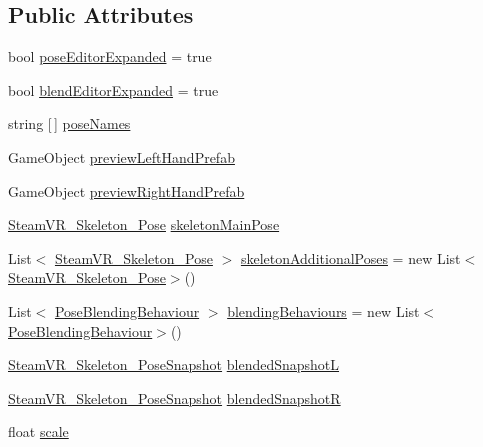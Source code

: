 \subsection*{Public Attributes}
\begin{DoxyCompactItemize}
\item 
bool \mbox{\hyperlink{class_valve_1_1_v_r_1_1_steam_v_r___skeleton___poser_a47aa0b9803b361b0518695718955192a}{pose\+Editor\+Expanded}} = true
\item 
bool \mbox{\hyperlink{class_valve_1_1_v_r_1_1_steam_v_r___skeleton___poser_a1bac4a8ce5dd0cedbc5126154932280f}{blend\+Editor\+Expanded}} = true
\item 
string \mbox{[}$\,$\mbox{]} \mbox{\hyperlink{class_valve_1_1_v_r_1_1_steam_v_r___skeleton___poser_abeafebc03bed7cc5d5623d83208a6e6d}{pose\+Names}}
\item 
Game\+Object \mbox{\hyperlink{class_valve_1_1_v_r_1_1_steam_v_r___skeleton___poser_ab2d13935101e7db95b96aaf376f67760}{preview\+Left\+Hand\+Prefab}}
\item 
Game\+Object \mbox{\hyperlink{class_valve_1_1_v_r_1_1_steam_v_r___skeleton___poser_ae6c7284216508bfdc311addf0e2f6824}{preview\+Right\+Hand\+Prefab}}
\item 
\mbox{\hyperlink{class_valve_1_1_v_r_1_1_steam_v_r___skeleton___pose}{Steam\+V\+R\+\_\+\+Skeleton\+\_\+\+Pose}} \mbox{\hyperlink{class_valve_1_1_v_r_1_1_steam_v_r___skeleton___poser_a2b3e48f48a00bd16a66e58c124e5ec45}{skeleton\+Main\+Pose}}
\item 
List$<$ \mbox{\hyperlink{class_valve_1_1_v_r_1_1_steam_v_r___skeleton___pose}{Steam\+V\+R\+\_\+\+Skeleton\+\_\+\+Pose}} $>$ \mbox{\hyperlink{class_valve_1_1_v_r_1_1_steam_v_r___skeleton___poser_a30d0f0bf1ff8e5473312926dbdeca283}{skeleton\+Additional\+Poses}} = new List$<$\mbox{\hyperlink{class_valve_1_1_v_r_1_1_steam_v_r___skeleton___pose}{Steam\+V\+R\+\_\+\+Skeleton\+\_\+\+Pose}}$>$()
\item 
List$<$ \mbox{\hyperlink{class_valve_1_1_v_r_1_1_steam_v_r___skeleton___poser_1_1_pose_blending_behaviour}{Pose\+Blending\+Behaviour}} $>$ \mbox{\hyperlink{class_valve_1_1_v_r_1_1_steam_v_r___skeleton___poser_a3b50d4d4b057f02bfe0a6a9295c96ea7}{blending\+Behaviours}} = new List$<$\mbox{\hyperlink{class_valve_1_1_v_r_1_1_steam_v_r___skeleton___poser_1_1_pose_blending_behaviour}{Pose\+Blending\+Behaviour}}$>$()
\item 
\mbox{\hyperlink{class_valve_1_1_v_r_1_1_steam_v_r___skeleton___pose_snapshot}{Steam\+V\+R\+\_\+\+Skeleton\+\_\+\+Pose\+Snapshot}} \mbox{\hyperlink{class_valve_1_1_v_r_1_1_steam_v_r___skeleton___poser_a6ac255b035d6ac7d96141e4767b4d038}{blended\+SnapshotL}}
\item 
\mbox{\hyperlink{class_valve_1_1_v_r_1_1_steam_v_r___skeleton___pose_snapshot}{Steam\+V\+R\+\_\+\+Skeleton\+\_\+\+Pose\+Snapshot}} \mbox{\hyperlink{class_valve_1_1_v_r_1_1_steam_v_r___skeleton___poser_afc6d17e124a917de2110c00b7c5f0377}{blended\+SnapshotR}}
\item 
float \mbox{\hyperlink{class_valve_1_1_v_r_1_1_steam_v_r___skeleton___poser_aa03c5cbb4caafd113219eee161a887c7}{scale}}
\end{DoxyCompactItemize}
